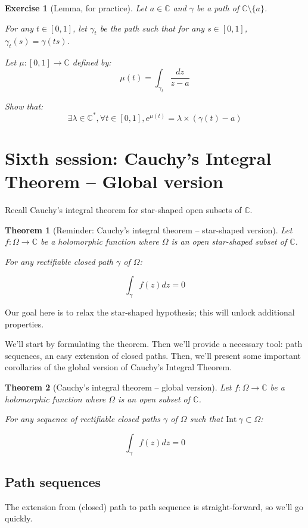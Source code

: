 \documentclass{article}
\newtheorem{exo}{Exercise}
\newtheorem*{thm*}{Theorem}
\begin{document}
\begin{exo}[Lemma, for practice]
    Let $a\in\mathbb{C}$ and $\gamma$ be a path of $\mathbb{C} \setminus \lbrace a \rbrace$.

    For any $t\in[0,1]$, let $\gamma_t$ be the path such that for any $s\in[0,1]$, $\gamma_t(s) = \gamma(ts)$. 

    Let $\mu : [0,1] \rightarrow \mathbb{C}$ defined by:
    $$ \mu(t) = \int_{\gamma_t} \frac{dz}{z-a}$$ 

    Show that:
    $$\exists \lambda\in\mathbb{C}^*, \forall t \in [0,1], e^{\mu(t)} = \lambda \times (\gamma(t) -a) $$
\end{exo}

\newpage
\section{Sixth session: Cauchy's Integral Theorem  -- Global version}

Recall Cauchy's integral theorem for star-shaped open subsets of $\mathbb{C}$.

\begin{thm*}[Reminder: Cauchy's integral theorem -- star-shaped version]
    Let $f: \Omega \rightarrow \mathbb{C}$ be a holomorphic function where $\Omega$ is an open star-shaped subset of $\mathbb{C}$.

    For any rectifiable closed path $\gamma$ of $\Omega$:

    $$ \int_\gamma f(z)dz = 0 $$
\end{thm*}

Our goal here is to relax the star-shaped hypothesis; this will unlock additional properties.

We'll start by formulating the theorem. Then we'll provide a necessary tool: path sequences, an easy extension of closed paths. Then, we'll present some important corollaries of the global version of Cauchy's Integral Theorem.


\begin{thm*}[Cauchy's integral theorem -- global version]
    Let $f: \Omega \rightarrow \mathbb{C}$ be a holomorphic function where $\Omega$ is an open subset of $\mathbb{C}$.

    For any sequence of rectifiable closed paths $\gamma$ of $\Omega$ such that $\mathrm{Int}~\gamma \subset \Omega$:

    $$ \int_\gamma f(z)dz = 0 $$
\end{thm*}

\subsection*{Path sequences}
The extension from (closed) path to path sequence is straight-forward, so we'll go quickly. 
\end{document}
